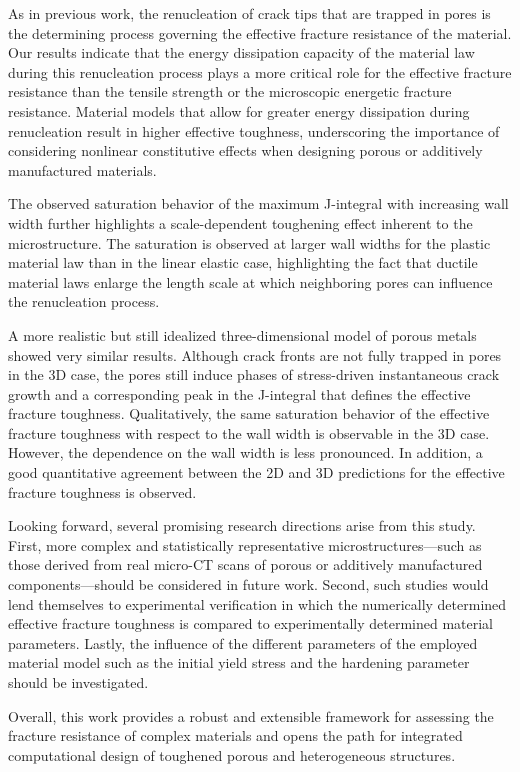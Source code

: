\documentclass[pdflatex,sn-mathphys-num]{sn-jnl}%
\theoremstyle{thmstyleone}%
\theoremstyle{thmstyletwo}%
\theoremstyle{thmstylethree}%
\begin{document}
As in previous work, the renucleation of crack tips that are trapped in pores is the determining
process governing the effective fracture resistance of the material. Our results indicate that the
energy dissipation capacity of the material law during this renucleation process plays a more
critical role for the effective fracture resistance than the tensile strength or the microscopic
energetic fracture resistance. Material models that allow for greater energy dissipation during
renucleation result in higher effective toughness, underscoring the importance of considering
nonlinear constitutive effects when designing porous or additively manufactured materials.

The observed saturation behavior of the maximum J-integral with increasing wall width further
highlights a scale-dependent toughening effect inherent to the microstructure. The saturation is
observed at larger wall widths for the plastic material law than in the linear elastic case,
highlighting the fact that ductile material laws enlarge the length scale at which neighboring pores
can influence the renucleation process.

A more realistic but still idealized three-dimensional model of porous metals showed very similar
results. Although crack fronts are not fully trapped in pores in the 3D case, the pores still induce
phases of stress-driven instantaneous crack growth and a corresponding peak in the J-integral that
defines the effective fracture toughness. Qualitatively, the same saturation behavior of the
effective fracture toughness with respect to the wall width is observable in the 3D case. However,
the dependence on the wall width is less pronounced. In addition, a good quantitative agreement
between the 2D and 3D predictions for the effective fracture toughness is observed.

Looking forward, several promising research directions arise from this study. 
First, more complex
and statistically representative microstructures—such 
as those derived from real micro-CT scans of
porous or additively manufactured components—should 
be considered in future work. Second, such studies would lend themselves to experimental
verification in which the numerically determined effective fracture toughness is compared to 
experimentally determined material parameters. Lastly, the influence of the 
different parameters of the employed material model such as the initial yield stress and the hardening
parameter should be investigated.

Overall, this work provides a robust and extensible framework for assessing the fracture resistance
of complex materials and opens the path for integrated computational design of toughened porous and
heterogeneous structures.
\end{document}
